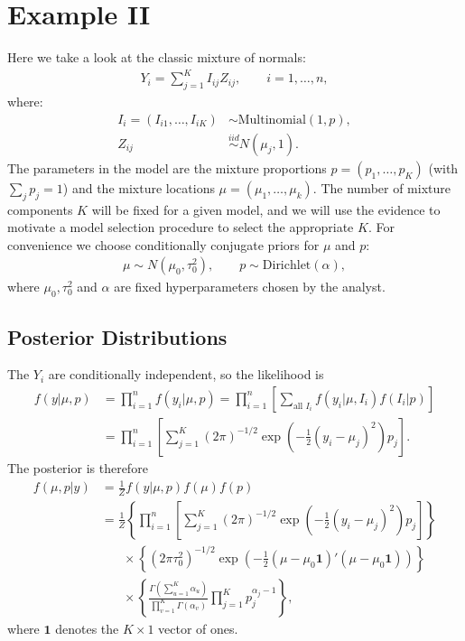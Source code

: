 \documentclass[11pt]{article}
\newcommand{\iid}{\stackrel{iid}{\sim}}
\begin{document}
\section{Example II}
Here we take a look at the classic mixture of normals:
\begin{align*}
 Y_{i} = \sum_{j=1}^{K}I_{ij}Z_{ij} , \qquad i=1,\ldots,n , 
\end{align*}
where:
\begin{align*}
 I_{i} = (I_{i1},\ldots,I_{iK}) &\sim \textrm{Multinomial}\left(1,p\right) , \\ 
 Z_{ij} &\iid N\left(\mu_{j},1\right) .
\end{align*}
The parameters in the model are the mixture proportions $p=(p_{1},\ldots,p_{K})$ (with $\sum_{j}p_{j}=1$) and the mixture locations $\mu=(\mu_{1},\ldots,\mu_{k})$. The number of mixture components $K$ will be fixed for a given model, and we will use the evidence to motivate a model selection procedure to select the appropriate $K$. For convenience we choose conditionally conjugate priors for $\mu$ and $p$:
\begin{align*}
 \mu \sim N\left(\mu_{0},\tau_{0}^{2}\right) , 
 \qquad p \sim \textrm{Dirichlet}\left(\alpha\right) ,
\end{align*}
where $\mu_{0}, \tau_{0}^{2}$ and $\alpha$ are fixed hyperparameters chosen by the analyst.

\subsection{Posterior Distributions}

The $Y_i$ are conditionally independent, so the likelihood is
\begin{align*}
    f(y \vert \mu, p)
    &=
    \prod_{i=1}^n f(y_i \vert \mu, p)
    =
    \prod_{i=1}^n \left[
        \sum_{\text{all } I_i} f(y_i \vert \mu, I_i) f(I_i \vert p)
    \right]
    \\ &=
    \prod_{i=1}^n \left[
        \sum_{j=1}^K (2\pi)^{-1/2} 
        \exp \left(
            -\frac{1}{2} (y_i - \mu_j)^2
        \right)
        p_j
    \right].
\end{align*}
The posterior is therefore
\begin{align*}
    f(\mu, p \vert y)
    &=
    \frac{1}{Z}
    f(y \vert \mu, p) f(\mu) f(p)
    \\ &=
    \frac{1}{Z}
    \left\{
        \prod_{i=1}^n \left[
            \sum_{j=1}^K (2\pi)^{-1/2} 
            \exp \left(
                -\frac{1}{2} (y_i - \mu_j)^2
            \right)
            p_j
        \right]
    \right\}
    \\ &\phantom{=\ \,} \times
    \left\{
        (2\pi\tau_0^2)^{-1/2}
        \exp\left(
            -\frac{1}{2} (\mu - \mu_0 \bm{1})'(\mu - \mu_0 \bm{1})
        \right)
    \right\}
    \\ &\phantom{=\ \,} \times
    \left\{
        \frac{\Gamma\left( \sum_{u=1}^K \alpha_u \right)} 
            {\prod_{v=1}^K \Gamma(\alpha_v)}
        \prod_{j=1}^K p_j^{\alpha_j - 1}
    \right\},
\end{align*}
where $\bm{1}$ denotes the $K \times 1$ vector of ones.
\end{document}
